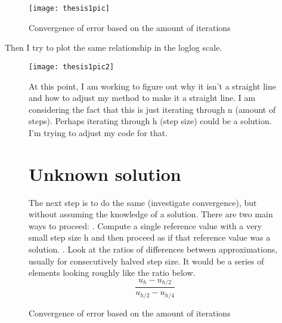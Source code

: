 \documentclass[12pt]{article}
\begin{document}
\begin{figure}[h]
\caption{Convergence of error based on the amount of iterations}
\texttt{[image: thesis1pic]}
\end{figure}

\newline Then I try to plot the same relationship in the loglog scale.

\begin{figure}[h]
\caption{Convergence of error based on the amount of iterations}
\texttt{[image: thesis1pic2]}

\newline At this point, I am working to figure out why it isn't a straight line and how to adjust my method to make it a straight line. I am considering the fact that this is just iterating through n (amount of steps). Perhaps iterating through h (step size) could be a solution. I'm trying to adjust my code for that.
\section{Unknown solution}
The next step is to do the same (investigate convergence), but without assuming the knowledge of a solution. There are two main ways to proceed:
. Compute a single reference value with a very small step size h and then proceed as if that reference value was a solution.
. Look at the ratios of differences between approximations, usually for consecutively halved step size. It would be a series of elements looking roughly like the ratio below.
$$ \frac{u_{h}-u_{h/2}}{u_{h/2}-u_{h/4}}$$
\end{figure}
\end{document}
